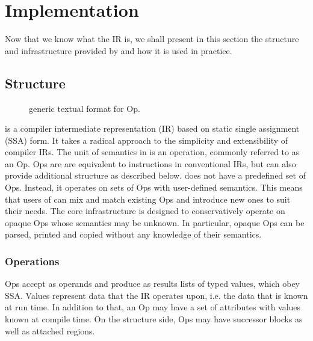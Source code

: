 \section{Implementation}

Now that we know what the IR is, we shall present in this section the
structure and infrastructure provided by \MLIR and how it is used in practice.


\subsection{Structure}

\begin{figure}

\caption{\MLIR generic textual format for Op.}
\end{figure}

\MLIR is a compiler intermediate representation (IR) based on static single
assignment (SSA) form.  It takes a radical approach to the simplicity and
extensibility of compiler IRs. The unit of semantics in \MLIR is an operation,
commonly referred to as an Op. Ops are are equivalent to instructions in
conventional IRs, but can also provide additional structure as described below.
\MLIR does not have a predefined set of Ops.  Instead, it operates on sets of
Ops with user-defined semantics. This means that users of \MLIR can mix and
match existing Ops and introduce new ones to suit their needs. The core
infrastructure is designed to conservatively operate on opaque Ops whose
semantics may be unknown. In particular, opaque Ops can be parsed, printed and
copied without any knowledge of their semantics.

\subsubsection{Operations}

Ops accept as operands and produce as results lists of typed values, which obey
SSA. Values represent data that the IR operates upon, i.e. the data that is
known at run time. In addition to that, an Op may have a set of attributes with
values known at compile time. On the structure side, Ops may have successor
blocks as well as attached regions.

